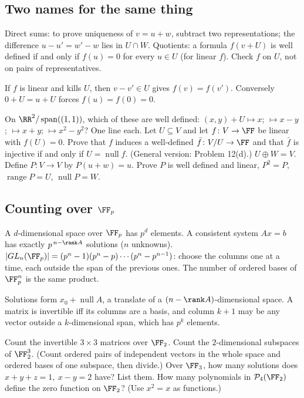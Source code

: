 \documentclass[11pt]{scrartcl}
\DeclareMathOperator{\nul}{null}
\DeclareMathOperator{\range}{range}
\DeclareMathOperator{\spn}{span}
\newcommand{\PP}{\mathcal P}
\begin{document}
\subsection{Two names for the same thing}
\begin{theorem*}[T11]
  Direct sums: to prove uniqueness of $v=u+w$, subtract two representations; the difference $u-u'=w'-w$ lies in $U\cap W$.
  Quotients: a formula $f(v+U)$ is well defined if and only if $f(u)=0$ for every $u\in U$ (for linear $f$). Check $f$ on $U$, not on pairs of representatives.
\end{theorem*}
\why If $f$ is linear and kills $U$, then $v-v'\in U$ gives $f(v)=f(v')$. Conversely $0+U=u+U$ forces $f(u)=f(0)=0$.
\probs
\begin{enumerate}[(a)]
  \ii On $\RR^2/\spn((1,1))$, which of these are well defined: $(x,y)+U\mapsto x$; $\mapsto x-y$; $\mapsto x+y$; $\mapsto x^2-y^2$? One line each.
  \ii Let $U\subseteq V$ and let $f\colon V\to\FF$ be linear with $f(U)=0$. Prove that $f$ induces a well-defined $\bar f\colon V/U\to\FF$ and that $\bar f$ is injective if and only if $U=\nul f$. (General version: Problem 12(d).)
  \ii $U\oplus W=V$. Define $P\colon V\to V$ by $P(u+w)=u$. Prove $P$ is well defined and linear, $P^2=P$, $\range P=U$, $\nul P=W$.
\end{enumerate}

\subsection{Counting over \texorpdfstring{$\FF_p$}{F\_p}}
\begin{theorem*}[T12]
  A $d$-dimensional space over $\FF_p$ has $p^d$ elements.
  A consistent system $Ax=b$ has exactly $p^{\,n-\rank A}$ solutions ($n$ unknowns).
  $|GL_n(\FF_p)|=(p^n-1)(p^n-p)\cdots(p^n-p^{n-1})$: choose the columns one at a time, each outside the span of the previous ones.
  The number of ordered bases of $\FF_p^n$ is the same product.
\end{theorem*}
\why Solutions form $x_0+\nul A$, a translate of a $(n-\rank A)$-dimensional space. A matrix is invertible iff its columns are a basis, and column $k+1$ may be any vector outside a $k$-dimensional span, which has $p^k$ elements.
\probs
\begin{enumerate}[(a)]
  \ii Count the invertible $3\times3$ matrices over $\FF_2$.
  \ii Count the $2$-dimensional subspaces of $\FF_2^3$. (Count ordered pairs of independent vectors in the whole space and ordered bases of one subspace, then divide.)
  \ii Over $\FF_3$, how many solutions does $x+y+z=1,\ x-y=2$ have? List them.
  \ii How many polynomials in $\PP_4(\FF_2)$ define the zero function on $\FF_2$? (Use $x^2=x$ as functions.)
\end{enumerate}
\end{document}
